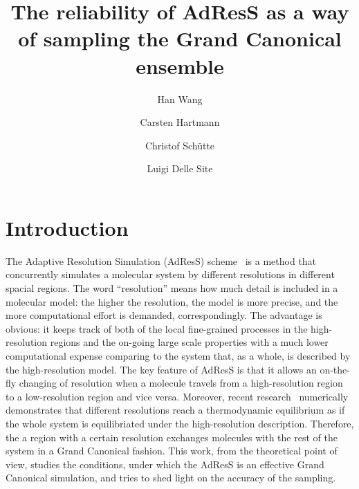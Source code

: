 \documentclass[aip,jcp,a4paper,reprint,onecolumn]{revtex4-1}
\begin{document}
\title{The reliability of AdResS as a way of
sampling the Grand Canonical ensemble}
\author{Han Wang}
\author{Carsten Hartmann}
\author{Christof Sch\"utte}
\author{Luigi Delle Site}

\begin{abstract}
\end{abstract}

\maketitle

\section{Introduction}
The Adaptive Resolution Simulation (AdResS) scheme~\cite{jcp,pre} is a
method that concurrently simulates a molecular system by different
resolutions in different spacial regions.  The word ``resolution''
means how much detail is included in a molecular model: the higher the
resolution, the model is more precise, and the more computational
effort is demanded, correspondingly.  The advantage is obvious: it
keeps track of both of the local fine-grained processes in the
high-resolution regions and the on-going large scale properties with a
much lower computational expense comparing to the system that, as a
whole, is described by the high-resolution model. The key feature of
AdResS is that it allows an on-the-fly changing of resolution when a
molecule travels from a high-resolution region to a low-resolution
region and vice versa. Moreover, recent research~\cite{prlgc, rdfcorr}
numerically demonstrates that different resolutions reach a
thermodynamic equilibrium as if the whole system is equilibriated
under the high-resolution description. Therefore, the a region with a
certain resolution exchanges molecules with the rest of the system in
a Grand Canonical fashion. This work, from the theoretical point of
view, studies the conditions, under which the AdResS is an effective
Grand Canonical simulation, and tries to shed light on the accuracy of
the sampling.
\end{document}
